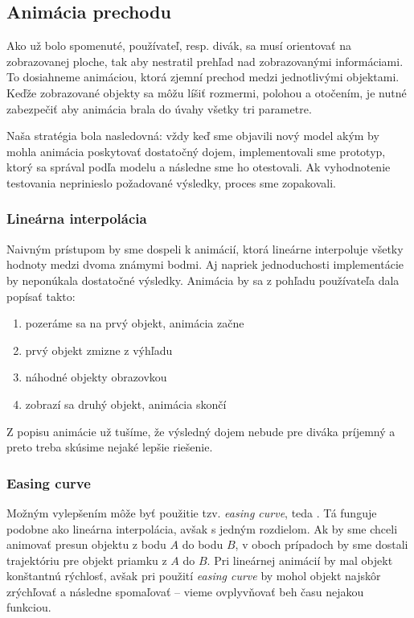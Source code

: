 \subsection{Animácia prechodu}

Ako už bolo spomenuté, používateľ, resp. divák, sa musí orientovať na zobrazovanej ploche, tak aby nestratil prehľad nad zobrazovanými informáciami. To dosiahneme animáciou, ktorá zjemní prechod medzi jednotlivými objektami. Keďže zobrazované objekty sa môžu líšiť rozmermi, polohou a otočením, je nutné zabezpečiť aby animácia brala do úvahy všetky tri parametre.

Naša stratégia bola nasledovná: vždy keď sme objavili nový model akým by mohla animácia poskytovať dostatočný dojem, implementovali sme prototyp, ktorý sa správal podľa modelu a následne sme ho otestovali. Ak vyhodnotenie testovania neprinieslo požadované výsledky, proces sme zopakovali.

\subsubsection{Lineárna interpolácia} \label{sec:linear-interpolation}
Naivným prístupom by sme dospeli k animácií, ktorá lineárne interpoluje všetky hodnoty medzi dvoma známymi bodmi. Aj napriek jednoduchosti implementácie by neponúkala dostatočné výsledky. Animácia by sa z pohľadu používateľa dala popísať takto:

\begin{enumerate}
 \item pozeráme sa na prvý objekt, animácia začne
 \item prvý objekt zmizne z výhľadu
 \item náhodné objekty  obrazovkou
 \item zobrazí sa druhý objekt, animácia skončí
\end{enumerate}

Z popisu animácie už tušíme, že výsledný dojem nebude pre diváka príjemný a preto treba skúsime nejaké lepšie riešenie.

\subsubsection{Easing curve}

Možným vylepšením môže byť použitie tzv. \textit{easing curve}, teda . Tá funguje podobne ako lineárna interpolácia, avšak s jedným rozdielom. Ak by sme chceli animovať presun objektu z bodu $A$ do bodu $B$, v oboch prípadoch by sme dostali trajektóriu pre objekt priamku z $A$ do $B$. Pri lineárnej animácií by mal objekt konštantnú rýchlosť, avšak pri použití \textit{easing curve} by mohol objekt najskôr zrýchľovať a následne spomaľovať -- vieme ovplyvňovať beh času nejakou funkciou.


